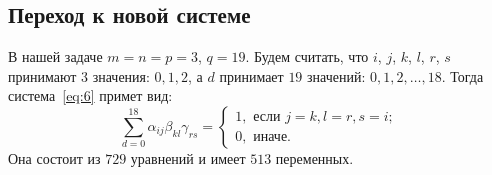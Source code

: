 \documentclass[12pt]{article}
\begin{document}
    \subsection{Переход к новой системе}
    В нашей задаче $ m = n = p = 3 $, $ q = 19 $.
    Будем считать, что $ i $, $ j $, $ k $, $ l $, $ r $, $ s $ принимают 3 значения: $ 0, 1, 2 $, а $ d $ принимает
    $ 19 $ значений: $ 0, 1, 2, \dots , 18 $.
    Тогда система~\eqref{eq:6} примет вид:
    \begin{equation}
        \sum_{d=0}^{18} \alpha_{ij} \beta_{kl} \gamma_{rs} =
        \begin{cases}
            1,\text{ если } j = k, l = r, s = i;\\
            0, \text{ иначе.}
        \end{cases}\label{eq:7}
    \end{equation}
    Она состоит из $ 729 $ уравнений и имеет $ 513 $ переменных.
\end{document}
